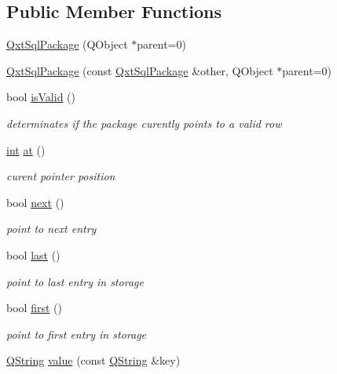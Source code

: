 \subsection*{Public Member Functions}
\begin{DoxyCompactItemize}
\item 
\hyperlink{class_qxt_sql_package_a396a7c2accc2306ef4580eeffe87575d}{Qxt\-Sql\-Package} (Q\-Object $\ast$parent=0)
\item 
\hyperlink{class_qxt_sql_package_ae299548003b9f1ba63b17321695f65fe}{Qxt\-Sql\-Package} (const \hyperlink{class_qxt_sql_package}{Qxt\-Sql\-Package} \&other, Q\-Object $\ast$parent=0)
\item 
bool \hyperlink{class_qxt_sql_package_a15c930583d93fab0d46dc102ae4b696c}{is\-Valid} ()
\begin{DoxyCompactList}\small\item\em determinates if the package curently points to a valid row \end{DoxyCompactList}\item 
\hyperlink{ioapi_8h_a787fa3cf048117ba7123753c1e74fcd6}{int} \hyperlink{class_qxt_sql_package_a876d5f178adf89c1f47197a526aa38fe}{at} ()
\begin{DoxyCompactList}\small\item\em curent pointer position \end{DoxyCompactList}\item 
bool \hyperlink{class_qxt_sql_package_a3c53546ad9510ff1e37aa042d8277594}{next} ()
\begin{DoxyCompactList}\small\item\em point to next entry \end{DoxyCompactList}\item 
bool \hyperlink{class_qxt_sql_package_a2db1b2f59c2b7a96fe0ac28db3a5bcab}{last} ()
\begin{DoxyCompactList}\small\item\em point to last entry in storage \end{DoxyCompactList}\item 
bool \hyperlink{class_qxt_sql_package_ae85d2a6bede4163e0d33acfac4ce3fef}{first} ()
\begin{DoxyCompactList}\small\item\em point to first entry in storage \end{DoxyCompactList}\item 
\hyperlink{group___u_a_v_objects_plugin_gab9d252f49c333c94a72f97ce3105a32d}{Q\-String} \hyperlink{class_qxt_sql_package_a6b0d004f679ee988b13f3b45588f789a}{value} (const \hyperlink{group___u_a_v_objects_plugin_gab9d252f49c333c94a72f97ce3105a32d}{Q\-String} \&key)

\end{DoxyCompactItemize}
